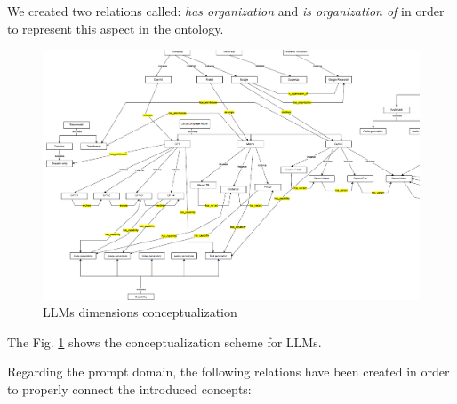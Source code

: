 We created two relations called: \textit{has organization} and \textit{is organization of} in order to represent this aspect in the ontology.
\begin{figure}[H]
    \centering
    \includegraphics[width=0.9\linewidth]{Figures/fig_26.png}
    \caption{LLMs dimensions conceptualization}
    \label{fig:26}
\end{figure}
The Fig. \ref{fig:26} shows the conceptualization scheme for LLMs.

Regarding the prompt domain, the following relations have been created in order to properly connect the introduced concepts:

